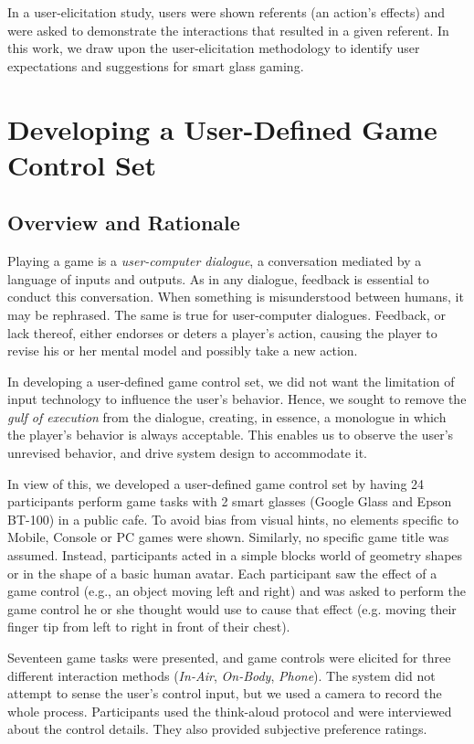 \documentclass{sigchi}
\begin{document}
    In a user-elicitation study, users were shown referents (an action's effects) and were asked to demonstrate the interactions that resulted in a given referent\cite{Wobbrock:2009:UGS:1518701.1518866}. In this work, we draw upon the user-elicitation methodology to identify user expectations and suggestions for smart glass gaming.

\section{Developing a User-Defined Game Control Set}


    \subsection {Overview and Rationale}
    Playing a game is a \textsl{user-computer dialogue}\cite{userComputer}, a conversation mediated by a language of inputs and outputs. As in any dialogue, feedback is essential to conduct this conversation. When something is misunderstood between humans, it may be rephrased. The same is true for user-computer dialogues. Feedback, or lack thereof, either endorses or deters a player's action, causing the player to revise his or her mental model and possibly take a new action.

    In developing a user-defined game control set, we did not want the limitation of input technology to influence the user's behavior. Hence, we sought to remove the \textsl{gulf of execution}\cite{gulf} from the dialogue, creating, in essence, a monologue in which the player's behavior is always acceptable. This enables us to observe the user's unrevised behavior, and drive system design to accommodate it.

    In view of this, we developed a user-defined game control set by having 24 participants perform game tasks with 2 smart glasses (Google Glass and Epson BT-100) in a public cafe. To avoid bias from visual hints\cite{Epps:2006:SHS:1125451.1125601}, no elements specific to Mobile, Console or PC games were shown. Similarly, no specific game title was assumed. Instead, participants acted in a simple blocks world of geometry shapes or in the shape of a basic human avatar. Each participant saw the effect of a game control (e.g., an object moving left and right) and was asked to perform the game control he or she thought would use to cause that effect (e.g. moving their finger tip from left to right in front of their chest). 

    Seventeen game tasks were presented, and game controls were elicited for three different interaction methods (\emph{In-Air}, \emph{On-Body}, \emph{Phone}). The system did not attempt to sense the user's control input, but we used a camera to record the whole process. Participants used the think-aloud protocol and were interviewed about the control details. They also provided subjective preference ratings.
\end{document}

